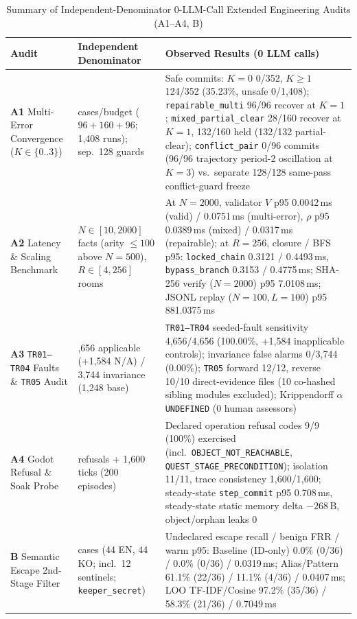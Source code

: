 \documentclass[journal]{IEEEtran}
\renewcommand{\arraystretch}{1.20}
\begin{document}
\begin{table}[!tbp]
\caption{Summary of Independent-Denominator 0-LLM-Call Extended Engineering Audits (A1--A4, B)}
\label{tab:extended-audits}
\centering
\small
\renewcommand{\arraystretch}{1.20}
\begin{tabularx}{\textwidth}{@{}>{\raggedright\arraybackslash}p{} >{\raggedright\arraybackslash}p{} >{\raggedright\arraybackslash}X@{}}
\toprule
\textbf{Audit} & \textbf{Independent Denominator} & \textbf{Observed Results (0 LLM calls)} \\
\midrule
\textbf{A1} Multi-Error Convergence ($K{\in}\{0..3\}$) & 352 cases/budget ($96{+}160{+}96$; 1,408 runs); sep.\ 128 guards & Safe commits: $K{=}0$ 0/352, $K{\ge}1$ 124/352 (35.23\%, unsafe 0/1,408); \texttt{repairable\_}\allowbreak\texttt{multi} 96/96 recover at $K{=}1$; \texttt{mixed\_}\allowbreak\texttt{partial\_}\allowbreak\texttt{clear} 28/160 recover at $K{=}1$, 132/160 held (132/132 partial-clear); \texttt{conflict\_}\allowbreak\texttt{pair} 0/96 commits (96/96 trajectory period-2 oscillation at $K{=}3$) vs.\ separate 128/128 same-pass conflict-guard freeze \\
\textbf{A2} Latency \& Scaling Benchmark & $N{\in}[10,2000]$ facts (arity ${\le}100$ above $N{=}500$), $R{\in}[4,256]$ rooms & At $N{=}2000$, validator $V$ p95 0.0042\,ms (valid) / 0.0751\,ms (multi-error), $\rho$ p95 0.0389\,ms (mixed) / 0.0317\,ms (repairable); at $R{=}256$, closure / BFS p95: \texttt{locked\_}\allowbreak\texttt{chain} 0.3121 / 0.4493\,ms, \texttt{bypass\_}\allowbreak\texttt{branch} 0.3153 / 0.4775\,ms; SHA-256 verify ($N{=}2000$) p95 7.0108\,ms; JSONL replay ($N{=}100, L{=}100$) p95 881.0375\,ms \\
\textbf{A3} \texttt{TR01--TR04} Faults \& \texttt{TR05} Audit & 4,656 applicable (+1,584 N/A) / 3,744 invariance (1,248 base) & \texttt{TR01--TR04} seeded-fault sensitivity 4,656/4,656 (100.00\%, +1,584 inapplicable controls); invariance false alarms 0/3,744 (0.00\%); \texttt{TR05} forward 12/12, reverse 10/10 direct-evidence files (10 co-hashed sibling modules excluded); Krippendorff $\alpha$ \texttt{UNDEFINED} (0 human assessors) \\
\textbf{A4} Godot Refusal \& Soak Probe & 11 refusals + 1,600 ticks (200 episodes) & Declared operation refusal codes 9/9 (100\%) exercised (incl.\ \texttt{OBJECT\_}\allowbreak\texttt{NOT\_}\allowbreak\texttt{REACHABLE}, \texttt{QUEST\_}\allowbreak\texttt{STAGE\_}\allowbreak\texttt{PRECONDITION}); isolation 11/11, trace consistency 1,600/1,600; steady-state \texttt{step\_}\allowbreak\texttt{commit} p95 0.708\,ms, steady-state static memory delta $-268$\,B, object/orphan leaks 0 \\
\textbf{B} Semantic Escape 2nd-Stage Filter & 88 cases (44 EN, 44 KO; incl.\ 12 sentinels; \texttt{keeper\_}\allowbreak\texttt{secret}) & Undeclared escape recall / benign FRR / warm p95: Baseline (ID-only) 0.0\% (0/36) / 0.0\% (0/36) / 0.0319\,ms; Alias/Pattern 61.1\% (22/36) / 11.1\% (4/36) / 0.0407\,ms; LOO TF-IDF/Cosine 97.2\% (35/36) / 58.3\% (21/36) / 0.7049\,ms \\
\bottomrule
\end{tabularx}
\end{table}
\end{document}
